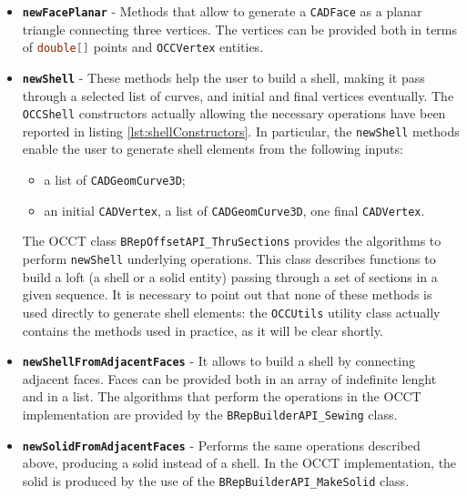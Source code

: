 \begin{itemize}
\item \textbf{\lstinline[language=Java]!newFacePlanar!} - Methods that allow to generate a \lstinline[language=Java]!CADFace! as a planar triangle connecting three vertices. The vertices can be provided both in terms of \lstinline[language=Java]!double[]! points and \lstinline[language=Java]!OCCVertex! entities.
\item \textbf{\lstinline[language=Java]!newShell!} - These methods help the user to build a shell, making it pass through a selected list of curves, and initial and final vertices eventually. The \lstinline[language=Java]!OCCShell! constructors actually allowing the necessary operations have been reported in listing \ref{lst:shellConstructors}. In particular, the \lstinline[language=Java]!newShell! methods enable the user to generate shell elements from the following inputs:
	\begin{itemize}
	\item a list of \lstinline[language=Java]!CADGeomCurve3D!;
	\item an initial \lstinline[language=Java]!CADVertex!, a list of \lstinline[language=Java]!CADGeomCurve3D!, one final \lstinline[language=Java]!CADVertex!.
	\end{itemize}
The \gls{OCCT} class \lstinline[language=Java]!BRepOffsetAPI_ThruSections! provides the algorithms to perform \lstinline[language=Java]!newShell! underlying operations. This class describes functions to build a loft (a shell or a solid entity) passing through a set of sections in a given sequence. It is necessary to point out that none of these methods is used directly to generate shell elements: the \lstinline[language=Java]!OCCUtils! utility class actually contains the methods used in practice, as it will be clear shortly. 
\item \textbf{\lstinline[language=Java]!newShellFromAdjacentFaces!} - It allows to build a shell by connecting adjacent faces. Faces can be provided both in an array of indefinite lenght and in a list. The algorithms that perform the operations in the \gls{OCCT} implementation are provided by the \lstinline[language=Java]!BRepBuilderAPI_Sewing! class.
\item \textbf{\lstinline[language=Java]!newSolidFromAdjacentFaces!} - Performs the same operations described above, producing a solid instead of a shell. In the \gls{OCCT} implementation, the solid is produced by the use of the \lstinline[language=Java]!BRepBuilderAPI_MakeSolid! class.
\end{itemize}
%

